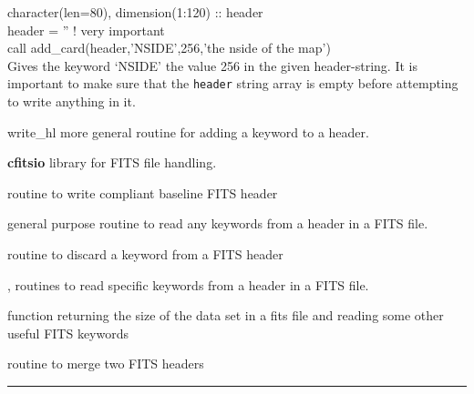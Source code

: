 \begin{example}
{
character(len=80), dimension(1:120) :: header \\
header = '' ! very important \\
call add\_card(header,'NSIDE',256,'the nside of the map')  \\
}
{
Gives the keyword `NSIDE' the value 256 in the given header-string. It is
important to make sure that the {\tt header} string array is empty before attempting
to write
anything in it.
}
\end{example}

\begin{modules}
  \begin{sulist}{} %
  \item[write\_hl] more general routine for adding a keyword to a header.
  \item[\textbf{cfitsio}] library for FITS file handling.		
  \end{sulist}
\end{modules}

\begin{related}
  \begin{sulist}{} %
  \item[\htmlref{write\_minimal\_header}{sub:write_minimal_header}] routine to
write \healpix compliant baseline FITS header
  \item[\htmlref{get\_card}{sub:get_card}] general purpose routine to read any keywords from a header in a FITS file.
  \item[\htmlref{del\_card}{sub:del_card}] routine to discard a keyword from a FITS header
  \item[\htmlref{read\_par}{sub:read_par}, \htmlref{number\_of\_alms}{sub:number_of_alms}] routines to read specific keywords from a
  header in a FITS file.
  \item[\htmlref{getsize\_fits}{sub:getsize_fits}] function returning the size of the data set in a fits
  file and reading some other useful FITS keywords
  \item[\htmlref{merge\_headers}{sub:merge_headers}] routine to merge two FITS headers
  \end{sulist}
\end{related}

\rule{\hsize}{2mm}

\newpage
